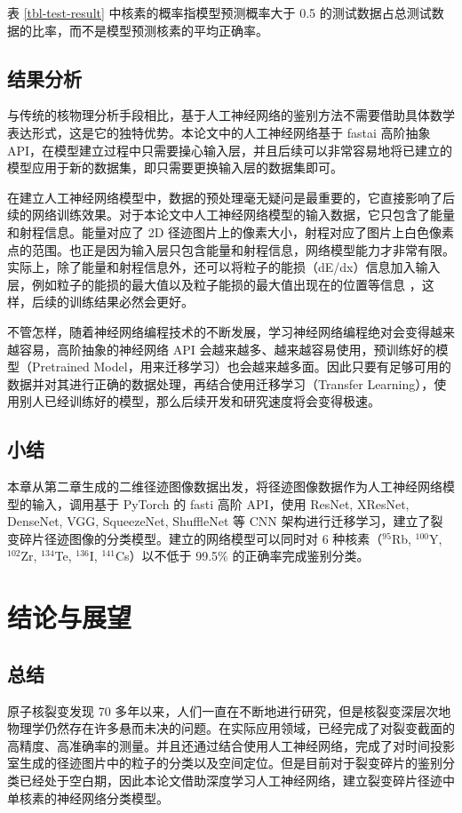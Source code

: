 \documentclass[AutoFakeBold]{LZUThesis}
\begin{document}
表 \ref{tbl-test-result} 中核素的概率指模型预测概率大于 0.5 的测试数据占总测试数据的比率，而不是模型预测核素的平均正确率。



\section{结果分析}
与传统的核物理分析手段相比，基于人工神经网络的鉴别方法不需要借助具体数学表达形式，这是它的独特优势。本论文中的人工神经网络基于 fastai 高阶抽象 API，在模型建立过程中只需要操心输入层，并且后续可以非常容易地将已建立的模型应用于新的数据集，即只需要更换输入层的数据集即可。

在建立人工神经网络模型中，数据的预处理毫无疑问是最重要的，它直接影响了后续的网络训练效果。对于本论文中人工神经网络模型的输入数据，它只包含了能量和射程信息。能量对应了 2D 径迹图片上的像素大小，射程对应了图片上白色像素点的范围。也正是因为输入层只包含能量和射程信息，网络模型能力才非常有限。实际上，除了能量和射程信息外，还可以将粒子的能损（dE/dx）信息加入输入层，例如粒子的能损的最大值以及粒子能损的最大值出现在的位置等信息 \cite{闫洋洋2018用于高精度裂变截面测量的时间投影室}，这样，后续的训练结果必然会更好。

不管怎样，随着神经网络编程技术的不断发展，学习神经网络编程绝对会变得越来越容易，高阶抽象的神经网络 API 会越来越多、越来越容易使用，预训练好的模型（Pretrained Model，用来迁移学习）也会越来越多面。因此只要有足够可用的数据并对其进行正确的数据处理，再结合使用迁移学习（Transfer Learning），使用别人已经训练好的模型，那么后续开发和研究速度将会变得极速。



\section{小结}
本章从第二章生成的二维径迹图像数据出发，将径迹图像数据作为人工神经网络模型的输入，调用基于 PyTorch 的 fasti 高阶 API，使用 ResNet, XResNet, DenseNet, VGG, SqueezeNet, ShuffleNet 等 CNN 架构进行迁移学习，建立了裂变碎片径迹图像的分类模型。建立的网络模型可以同时对 6 种核素（$^{95}$Rb, $^{100}$Y, $^{102}$Zr, $^{134}$Te, $^{136}$I, $^{141}$Cs）以不低于 99.5\% 的正确率完成鉴别分类。








\chapter{结论与展望}
\section{总结}
原子核裂变发现 70 多年以来，人们一直在不断地进行研究，但是核裂变深层次地物理学仍然存在许多悬而未决的问题。在实际应用领域，已经完成了对裂变截面的高精度、高准确率的测量。并且还通过结合使用人工神经网络，完成了对时间投影室生成的径迹图片中的粒子的分类以及空间定位。但是目前对于裂变碎片的鉴别分类已经处于空白期，因此本论文借助深度学习人工神经网络，建立裂变碎片径迹中单核素的神经网络分类模型。
\end{document}
